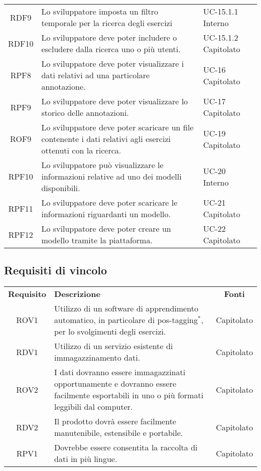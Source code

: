 \begin{tabularx}{\textwidth}{| c | p{10cm} | X |}
		RDF9 & Lo sviluppatore imposta un filtro temporale per la ricerca degli esercizi & UC-15.1.1 \newline Interno\\
		RDF10 &  Lo sviluppatore deve poter includere o escludere dalla ricerca uno o più utenti. & UC-15.1.2 \newline Capitolato\\
		RPF8 & Lo sviluppatore deve poter visualizzare i dati relativi ad una particolare annotazione. & UC-16 \newline Capitolato\\
		RPF9 & Lo sviluppatore deve poter visualizzare lo storico delle annotazioni. & UC-17 \newline Capitolato\\
		ROF9 & Lo sviluppatore deve poter scaricare un file contenente i dati relativi agli esercizi ottenuti con la ricerca. & UC-19 \newline Capitolato\\
		RPF10 & Lo sviluppatore può visualizzare le informazioni relative ad uno dei modelli disponibili. & UC-20 \newline Interno\\
		RPF11 & Lo sviluppatore deve poter scaricare le informazioni riguardanti un modello. & UC-21 \newline Capitolato\\
		RPF12 & Lo sviluppatore deve poter creare un modello tramite la piattaforma. & UC-22 \newline Capitolato\\ \hline
\end{tabularx}

\subsection{Requisiti di vincolo}
\begin{longtable}{| c | p{10cm} | c |}
		\rowcolor{LightBlue}
		\color{white}\bfseries Requisito & \color{white}\bfseries Descrizione & \color{white}\bfseries Fonti\\[0.25cm]
		ROV1 & Utilizzo di un software di apprendimento automatico, in particolare di pos-tagging$^*$, per lo svolgimenti degli esercizi. & Capitolato \\
		RDV1 & Utilizzo di un servizio esistente di immagazzinamento dati. & Capitolato \\
		ROV2 & I dati dovranno essere immagazzinati opportunamente e dovranno essere facilmente esportabili in uno o più formati leggibili dal computer. & Capitolato \\
		RDV2 & Il prodotto dovrà essere facilmente manutenibile, estensibile e portabile. & Capitolato \\
		RPV1 & Dovrebbe essere consentita la raccolta di dati in più lingue. & Capitolato \\ \hline
\end{longtable}

